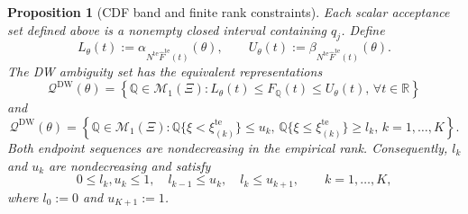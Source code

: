\documentclass[review,11pt,3p,authoryear,nopreprintline]{elsarticle}
\newtheorem{proposition}{Proposition}
\begin{document}
\begin{proposition}[CDF band and finite rank constraints]
  \label{prop-finite-rank-constraints}
  Each scalar acceptance set defined above is a nonempty closed interval containing $q_j$. Define
  \[
    L_\theta(t):=\alpha_{N^{\mathrm{te}}\widehat F^{\mathrm{te}}(t)}(\theta),
    \qquad
    U_\theta(t):=\beta_{N^{\mathrm{te}}\widehat F^{\mathrm{te}}(t)}(\theta).
  \]
  The DW ambiguity set has the equivalent representations
  \begin{equation*}
    \mathcal Q^{\mathrm{DW}}(\theta) =\left\{\mathbb Q\in\mathcal M_1(\Xi): L_\theta(t)\le F_{\mathbb Q}(t)\le U_\theta(t), \, \forall t\in\mathbb R\right\}
  \end{equation*}
  and
  \begin{equation}
    \mathcal Q^{\mathrm{DW}}(\theta)
    =\left\{\mathbb Q\in\mathcal M_1(\Xi): \mathbb Q\{\xi<\xi_{(k)}^{\mathrm{te}}\}\le u_k, \, \mathbb Q\{\xi\le \xi_{(k)}^{\mathrm{te}}\}\ge l_k, \, k=1,\ldots,K \right\}.
    \label{eq-finite-rank-constraints}
  \end{equation}
  Both endpoint sequences are nondecreasing in the empirical rank. Consequently, $l_k$ and $u_k$ are nondecreasing and satisfy
  \begin{equation*}
    0\le l_k,u_k\le1,\quad
    l_{k-1}\le u_k,\quad
    l_k\le u_{k+1},
    \qquad k=1,\ldots,K,
  \end{equation*}
  where $l_0:=0$ and $u_{K+1}:=1$.
\end{proposition}
\end{document}
